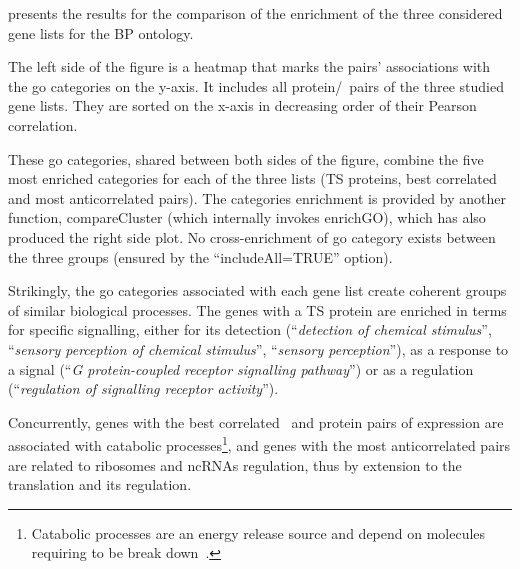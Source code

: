  presents the results for
the comparison of the enrichment of the three considered gene lists
for the BP ontology.

The left side of the figure is a heatmap
that marks the pairs' associations with the \gls{go} categories on the y-axis.
It includes all protein/\mRNA\ pairs of the three studied gene lists.
They are sorted on the x-axis in decreasing order of their Pearson correlation.

These \gls{go} categories, shared between both sides of the figure,
combine the five most enriched categories
for each of the three lists (\gls{TS} proteins, best correlated
and most anticorrelated pairs).
The categories enrichment is provided by another  function,
\textsf{compareCluster} (which internally invokes \textsf{enrichGO}),
which has also produced the right side plot.
No cross-enrichment of \gls{go} category exists between the three groups
(ensured by the \enquote{\textsf{includeAll=TRUE}} option).\mybr\

Strikingly, the \gls{go} categories associated with each gene list create
coherent groups of similar biological processes.
The genes with a \gls{TS} protein are enriched in terms for specific signalling,
either for its detection (\enquote{\textit{detection of chemical stimulus}},
\enquote{\textit{sensory perception of chemical stimulus}},
\enquote{\textit{sensory perception}}),
as a response to a signal (\enquote{\textit{G protein-coupled receptor signalling pathway}})
or as a regulation (\enquote{\textit{regulation of signalling receptor activity}}).

Concurrently, genes with the best correlated \mRNA\ and protein pairs
of expression are associated with catabolic processes\footnote{%
Catabolic processes are an energy release source
and depend on molecules requiring to be break down~.},
and genes with the most anticorrelated pairs are related to
ribosomes and \glspl{ncRNA} regulation,
thus by extension to the translation and its regulation.

